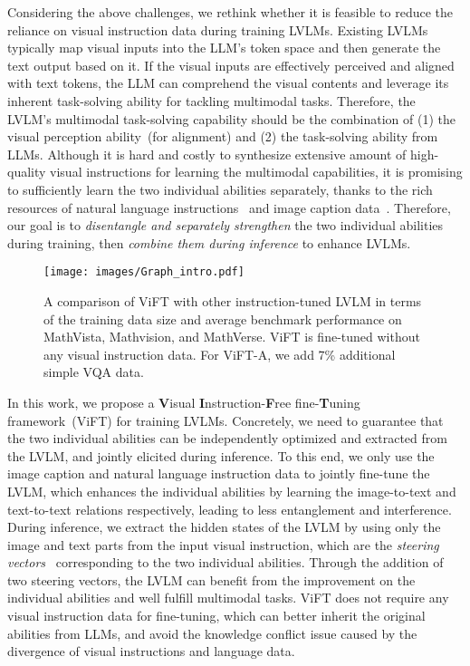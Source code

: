 Considering the above challenges, we rethink whether it is feasible to reduce the reliance on visual instruction data during training LVLMs. Existing LVLMs typically map visual inputs into the LLM's token space and then generate the text output based on it. If the visual inputs are effectively perceived and aligned with text tokens, the LLM can comprehend the visual contents and leverage its inherent task-solving ability for tackling multimodal tasks. Therefore, the LVLM's multimodal task-solving capability should be the combination of (1) the visual perception ability~(for alignment) and (2) the task-solving ability from LLMs. 
Although it is hard and costly to synthesize extensive amount of high-quality visual instructions for learning the multimodal capabilities, it is promising to sufficiently learn the two individual abilities separately, thanks to the rich resources of natural language instructions~\cite{weifinetuned,OpenHermes2-5} and image caption data~\cite{schuhmann2021laion,chen2024allava}. Therefore, our goal is to \emph{disentangle and separately strengthen} the two individual abilities during training, then \emph{combine them during inference} to enhance LVLMs.


\begin{figure}[t]
    \centering
    \texttt{[image: images/Graph\_intro.pdf]}
        \caption{A comparison of ViFT with other instruction-tuned LVLM in terms of the training data size and average benchmark performance on MathVista, Mathvision, and MathVerse. ViFT is fine-tuned without any visual instruction data. For ViFT-A, we add 7\% additional simple VQA data.}
    \label{fig:intro_graph}
\end{figure}


In this work, we propose a \textbf{V}isual \textbf{I}nstruction-\textbf{F}ree fine-\textbf{T}uning framework~(ViFT) for training LVLMs.
Concretely, we need to guarantee that the two individual abilities can be independently optimized and extracted from the LVLM, and jointly elicited during inference.
To this end, we only use the image caption and natural language instruction data to jointly fine-tune the LVLM, which enhances the individual abilities by learning the image-to-text and text-to-text relations respectively, leading to less entanglement and interference. 
During inference, we extract the hidden states of the LVLM by using only the image and text parts from the input visual instruction, which are the \emph{steering vectors}~\cite{subramani2022extracting,turner2023activation} corresponding to the two individual abilities.
Through the addition of two steering vectors, the LVLM can benefit from the improvement on the individual abilities and well fulfill multimodal tasks. ViFT does not require any visual instruction data for fine-tuning, which can better inherit the original abilities from LLMs, and avoid the knowledge conflict issue caused by the divergence of visual instructions and language data.

